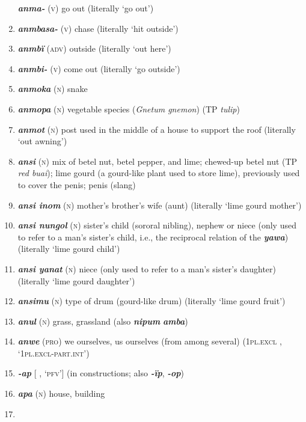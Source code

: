\begin{enumerate}[noitemsep, label={}, align=left, widest=190, labelsep=1ex,leftmargin=*,itemindent=-10pt]
\textbf{\textit{anma-}} (\textsc{v}) go out (literally ‘go out’) \item 
\textbf{\textit{anmbasa-}} (\textsc{v}) chase (literally ‘hit outside’) \item 
\textbf{\textit{anmbï}} (\textsc{adv}) outside (literally ‘out here’) \item 
\textbf{\textit{anmbi-}} (\textsc{v}) come out (literally ‘go outside’) \item 
\textbf{\textit{anmoka}} (\textsc{n}) snake \item 
\textbf{\textit{anmopa}} (\textsc{n}) vegetable species (\textit{Gnetum gnemon}) (TP \textit{tulip}) \item 
\textbf{\textit{anmot}} (\textsc{n}) post used in the middle of a house to support the roof (literally ‘out awning’) \item 
\textbf{\textit{ansi}} (\textsc{n}) mix of betel nut, betel pepper, and lime; chewed-up betel nut (TP \textit{red buai}); lime gourd (a gourd-like plant used to store lime), previously used to cover the penis; penis (slang) \item 
\textbf{\textit{ansi inom}} (\textsc{n}) mother’s brother’s wife (aunt) (literally ‘lime gourd mother’) \item 
\textbf{\textit{ansi nungol}} (\textsc{n}) sister’s child (sororal nibling), nephew or niece (only used to refer to a man’s sister’s child, i.e., the reciprocal relation of the \textbf{\textit{yawa}}) (literally ‘lime gourd child’) \item 
\textbf{\textit{ansi yanat}} (\textsc{n}) niece (only used to refer to a man’s sister’s daughter) (literally ‘lime gourd daughter’) \item 
\textbf{\textit{ansimu}} (\textsc{n}) type of drum (gourd-like drum) (literally ‘lime gourd fruit’) \item 
\textbf{\textit{anul}} (\textsc{n}) grass, grassland (also \textbf{\textit{nipum}} \textbf{\textit{amba}}) \item 
\textbf{\textit{anwe}} (\textsc{pro}) we ourselves, us ourselves (from among several) (\textsc{1pl.excl} \linebreak {}, ‘\textsc{1pl.excl-part.int}’) \item 
\textbf{\textit{-ap}} [ , ‘\textsc{pfv}’] (in  constructions; also \textbf{\textit{-ïp}}, \textbf{\textit{-op}}) \item 
\textbf{\textit{apa}} (\textsc{n}) house, building \item 

\end{enumerate}
